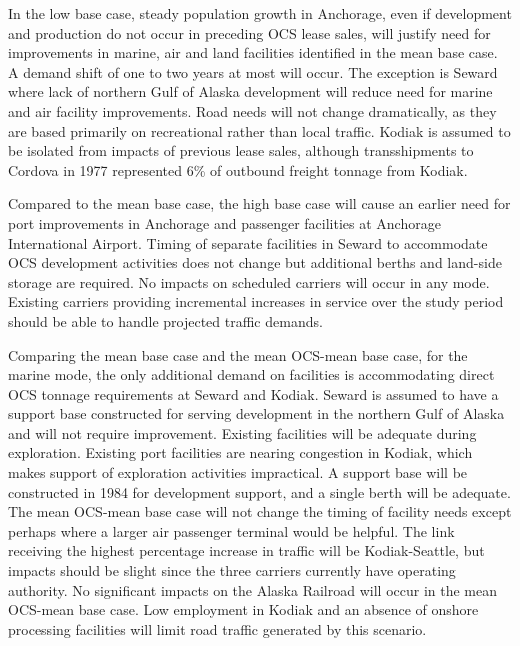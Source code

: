 \documentclass[11pt,a4paper]{article}
\begin{document}
In the low base case, steady population growth in Anchorage, even if development and production do not occur in preceding OCS lease sales, will justify need for improvements in marine, air and land facilities identified in the mean base case.  A demand shift of one to two years at most will occur.  The exception is Seward where lack of northern Gulf of Alaska development will reduce need for marine and air facility improvements.  Road needs will not change dramatically, as they are based primarily on recreational rather than local traffic.  Kodiak is assumed to be isolated from impacts of previous lease sales, although transshipments to Cordova in 1977 represented 6\% of outbound freight tonnage from Kodiak.

Compared to the mean base case, the high base case will cause an earlier need for port improvements in Anchorage and passenger facilities at Anchorage International Airport.  Timing of separate facilities in Seward to accommodate OCS development activities does not change but additional berths and land-side storage are required.  No impacts on scheduled carriers will occur in any mode.  Existing carriers providing incremental increases in service over the study period should be able to handle projected traffic demands.

Comparing the mean base case and the mean OCS-mean base case, for the marine mode, the only additional demand on facilities is accommodating direct OCS tonnage requirements at Seward and Kodiak.  Seward is assumed to have a support base constructed for serving development in the northern Gulf of Alaska and will not require improvement.  Existing facilities will be adequate during exploration.  Existing port facilities are nearing congestion in Kodiak, which makes support of exploration activities impractical.  A support base will be constructed in 1984 for development support, and a single berth will be adequate.  The mean OCS-mean base case will not change the timing of facility needs except perhaps where a larger air passenger terminal would be helpful.  The link receiving the highest percentage increase in traffic will be Kodiak-Seattle, but impacts should be slight since the three carriers currently have operating authority.  No significant impacts on the Alaska Railroad will occur in the mean OCS-mean base case.  Low employment in Kodiak and an absence of onshore processing facilities will limit road traffic generated by this scenario.
\end{document}
